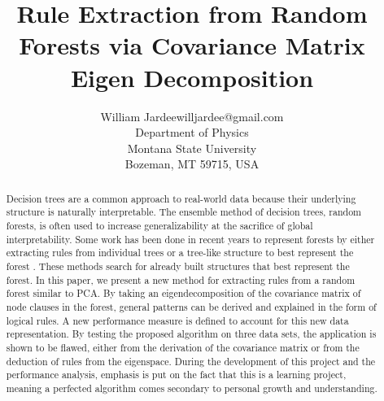 \documentclass[11pt]{article}
\begin{document}
\title{Rule Extraction from Random Forests via Covariance Matrix Eigen Decomposition}

\author{\name William Jardee\email willjardee@gmail.com \\
       \addr Department of Physics\\
       Montana State University\\
       Bozeman, MT 59715, USA
       }

\maketitle

\begin{abstract}%
\begin{small}
Decision trees are a common approach to real-world data because their underlying structure is naturally interpretable. The ensemble method of decision trees, random forests, is often used to increase generalizability at the sacrifice of global interpretability. Some work has been done in recent years to represent forests by either extracting rules from individual trees \citep{benard2021interpretable, mashayekhi2015rule} or a tree-like structure to best represent the forest \citep{boruah2022transparent, vidal2020born}. These methods search for already built structures that best represent the forest. In this paper, we present a new method for extracting rules from a random forest similar to PCA. By taking an eigendecomposition of the covariance matrix of node clauses in the forest, general patterns can be derived and explained in the form of logical rules. A new performance measure is defined to account for this new data representation. By testing the proposed algorithm on three data sets, the application is shown to be flawed, either from the derivation of the covariance matrix or from the deduction of rules from the eigenspace. During the development of this project and the performance analysis, emphasis is put on the fact that this is a learning project, meaning a perfected algorithm comes secondary to personal growth and understanding. 
\end{small}
\end{abstract}
 
\end{document}
